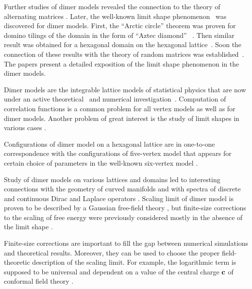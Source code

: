 \documentclass{article}
\begin{document}
Further studies of dimer models revealed the connection to the theory of alternating matrices
\cite{elkies1992alternating1,elkies1992alternating2}. Later, the well-known limit shape
phenomenon~\cite{vershik1977kerov} was discovered for dimer models. First, the ``Arctic circle''
theorem was proven for domino tilings of the domain in the form of ``Aztec diamond''
~\cite{1998math......1068J}. Then similar result was obtained for a hexagonal domain on the
hexagonal lattice~\cite{cohn1998shape}. Soon the connection of these results with the theory of
random matrices was established~\cite{johansson2002non}. The papers
\cite{kenyon2006dimers,kenyon2009lectures} present a detailed exposition of the limit shape
phenomenon in the dimer models.

Dimer models are the integrable lattice models of statistical physics that are now under an active
theoretical~\cite{zj2000,ferrari} and numerical investigation~\cite{ks2018}. Computation of
correlation functions is a common problem for all vertex models \cite{colomo2012approach} as well as
for dimer models. Another problem of great interest is the study of limit shapes in various cases
\cite{borodin2010q,di2018tangent}.

Configurations of dimer model on a hexagonal lattice are in one-to-one correspondence with the
configurations of five-vertex model that appears for certain choice of parameters in the well-known
six-vertex model \cite{kapitonov2012weighted,kapitonov2008five}.

Study of dimer models on various lattices and domains led to interesting connections with the
geometry of curved manifolds and with spectra of discrete and continuous Dirac and Laplace operators
\cite{kenyon2002laplacian,kenyon2000asymptotic}. Scaling limit of dimer model is proven to be
described by a Gaussian free-field theory \cite{kenyon2001dominos}, but finite-size corrections to
the scaling of free energy were previously considered mostly in the absence of the limit shape
\cite{Sh_Izmailian_2019,izmailian2016finite,izmailian2011dimer,izmailian2007non,izmailian2005logarithmic}.

Finite-size corrections are important to fill the gap between numerical simulations and
theoretical results. Moreover, they can be used to choose the proper field-theoretic description of
the scaling limit. For example, the logarithmic term is supposed to be universal and dependent on a
value of the central charge ${\bf c}$ of conformal field theory \cite{cardy1988finite}.
\end{document}
